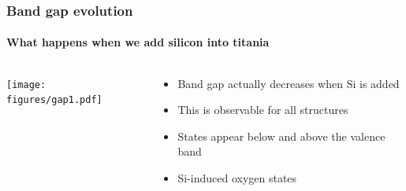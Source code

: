 \documentclass[noamsthm,8pt,t]{beamer}
\begin{document}
\begin{frame}
   \frametitle{Band gap evolution}
   \framesubtitle{What happens when we add silicon into titania}

   \begin{columns}
      \begin{column}{0.5\textwidth}
         \begin{center}
            \texttt{[image: figures/gap1.pdf]}
         \end{center}
      \end{column}
      \begin{column}{0.5\textwidth}
         \begin{itemize}
            \item Band gap actually decreases when Si is added
            \item This is observable for all structures
            \item<2-> States appear below and above the valence band
            \item<3> Si-induced oxygen states
         \end{itemize}
         \vspace{0.5cm}
      \end{column}
   \end{columns}
\end{frame}
\end{document}
